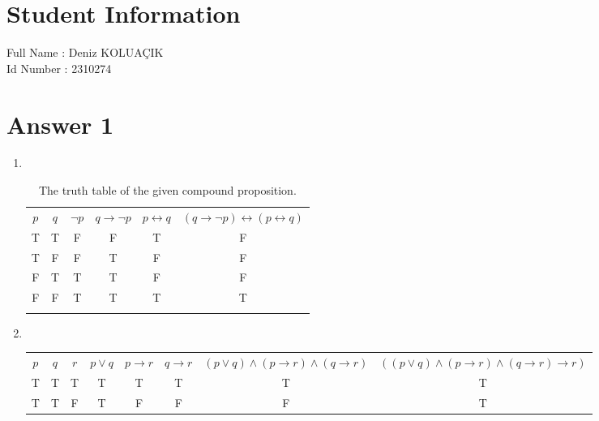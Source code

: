 \documentclass[12pt]{article}
\begin{document}
\section*{Student Information } 
Full Name : Deniz KOLUAÇIK \\
Id Number : 2310274 \\

\section*{Answer 1}

\begin{enumerate}[label=\textbf{\alph*)}]
	\item $ $
		\begin{table}[H]
		\centering	
		\begin{tabular}{||c|c|c|c|c|c||}
			\hhline{|t:=:=:=:=:=:=:t|}
			\textbf{$p$} & \textbf{$q$}  & \textbf{$\neg p$} & \textbf{$q\rightarrow\neg p$} & \textbf{$p\leftrightarrow q$} & \textbf{$(q\rightarrow\neg p)\leftrightarrow (p\leftrightarrow q)$} \\
			\hhline{|:=:=:=:=:=:=:|}
			T & T & F & F & T & F\\
			\hhline{||-|-|-|-|-|-||}
			T & F & F & T & F & F\\
			\hhline{||-|-|-|-|-|-||}
			F & T & T & T & F & F\\
			\hhline{||-|-|-|-|-|-||}
			F & F & T & T & T & T\\
			\hhline{|b:=:=:=:=:=:=:b|}
		\end{tabular}
			\caption{The truth table of the given compound proposition.}
			\end{table}
	\item $ $
		\begin{table}[H]
		\centering
		\begin{tabular}{||c|c|c|c|c|c|c|c||}
			\hhline{|t:=:=:=:=:=:=:=:=:t|}
			\textbf{$p$} & \textbf{$q$} & \textbf{$r$} &
			\textbf{$p\lor q$} & \textbf{$p\rightarrow r$} &
			\textbf{$q\rightarrow r$} &
			\textbf{$(p\lor q)\land(p\rightarrow r)\land(q\rightarrow r)$} &
			\textbf{$((p\lor q)\land(p\rightarrow r)\land(q\rightarrow r)\rightarrow r)$}\\
			\hhline{|:=:=:=:=:=:=:=:=:|}
			T & T & T & T & T & T & T & T\\
			\hhline{||-|-|-|-|-|-|-|-||}
			T & T & F & T & F & F & F & T\\

\end{tabular}
\end{table}
\end{enumerate}
\end{document}
